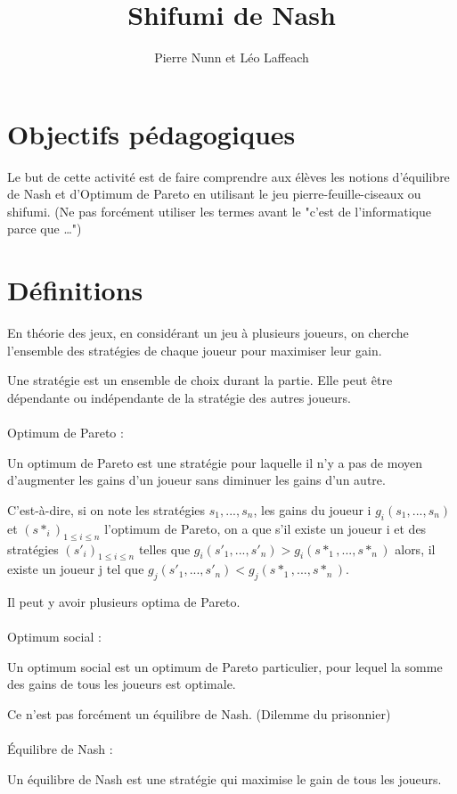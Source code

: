 \documentclass{article}
\title{Shifumi de Nash}
\author{Pierre Nunn et Léo Laffeach}
\begin{document}
\maketitle
\tableofcontents
\newpage
\section{Objectifs pédagogiques}

Le but de cette activité est de faire comprendre aux élèves les notions d'équilibre de Nash et d'Optimum de Pareto en utilisant le jeu pierre-feuille-ciseaux ou shifumi. (Ne pas forcément utiliser les termes avant le "c'est de l'informatique parce que \dots")

\section{Définitions}

En théorie des jeux, en considérant un jeu à plusieurs joueurs, on cherche l'ensemble des stratégies de chaque joueur pour maximiser leur gain. 

Une stratégie est un ensemble de choix durant la partie. Elle peut être dépendante ou indépendante de la stratégie des autres joueurs.
\\
\\
Optimum de Pareto : 

Un optimum de Pareto est une stratégie pour laquelle il n'y a pas de moyen d'augmenter les gains d'un joueur sans diminuer les gains d'un autre. 

C'est-à-dire, si on note les stratégies $s_1,..., s_n$, les gains du joueur i $g_i(s_1, ..., s_n)$ et $(s*_i)_{1\leq i \leq n}$ l'optimum de Pareto, on a que s'il existe un joueur i et des stratégies $(s'_i)_{1\leq i \leq n}$ telles que $g_i(s'_1, ..., s'_n) > g_i(s*_1, ..., s*_n)$ alors, il existe un joueur j tel que $g_j(s'_1, ..., s'_n) < g_j(s*_1, ..., s*_n)$.

Il peut y avoir plusieurs optima de Pareto.
\\
\\
Optimum social :

Un optimum social est un optimum de Pareto particulier, pour lequel la somme des gains de tous les joueurs est optimale.

Ce n'est pas forcément un équilibre de Nash. (Dilemme du prisonnier)
\\
\\
Équilibre de Nash : 

Un équilibre de Nash est une stratégie qui maximise le gain de tous les joueurs.
\end{document}
